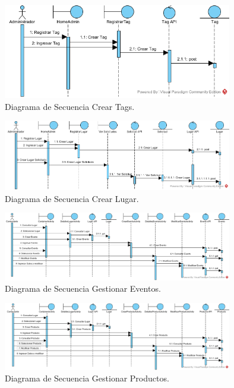 \documentclass[12pt,letterpaper,openany]{book}
\begin{document}
\begin{figure}[H]
\begin{center}
\includegraphics[width=10cm]{./imagenes/DS/DS_crear_tag}
\caption{Diagrama de Secuencia Crear Tags.}
\end{center}
\end{figure}

\begin{figure}[H]
\begin{center}
\includegraphics[width=10cm]{./imagenes/DS/DS_crear_lugar}
\caption{Diagrama de Secuencia Crear Lugar.}
\end{center}
\end{figure}

\begin{figure}[H]
\begin{center}
\includegraphics[width=10cm]{./imagenes/DS/DS_gestionar_eventos}
\caption{Diagrama de Secuencia Gestionar Eventos.}
\end{center}
\end{figure}

\begin{figure}[H]
\begin{center}
\includegraphics[width=10cm]{./imagenes/DS/DS_gestionar_producto}
\caption{Diagrama de Secuencia Gestionar Productos.}
\end{center}
\end{figure}
\end{document}
